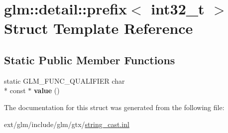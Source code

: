 \hypertarget{structglm_1_1detail_1_1prefix_3_01int32__t_01_4}{\section{glm\-:\-:detail\-:\-:prefix$<$ int32\-\_\-t $>$ Struct Template Reference}
\label{structglm_1_1detail_1_1prefix_3_01int32__t_01_4}
}
\subsection*{Static Public Member Functions}
\begin{DoxyCompactItemize}
\item 
\hypertarget{structglm_1_1detail_1_1prefix_3_01int32__t_01_4_a1e2bfac810e1195fa173ebca0dcdca57}{static G\-L\-M\-\_\-\-F\-U\-N\-C\-\_\-\-Q\-U\-A\-L\-I\-F\-I\-E\-R char \\*
const $\ast$ {\bfseries value} ()}\label{structglm_1_1detail_1_1prefix_3_01int32__t_01_4_a1e2bfac810e1195fa173ebca0dcdca57}

\end{DoxyCompactItemize}


The documentation for this struct was generated from the following file\-:\begin{DoxyCompactItemize}
\item 
ext/glm/include/glm/gtx/\hyperlink{string__cast_8inl}{string\-\_\-cast.\-inl}\end{DoxyCompactItemize}
